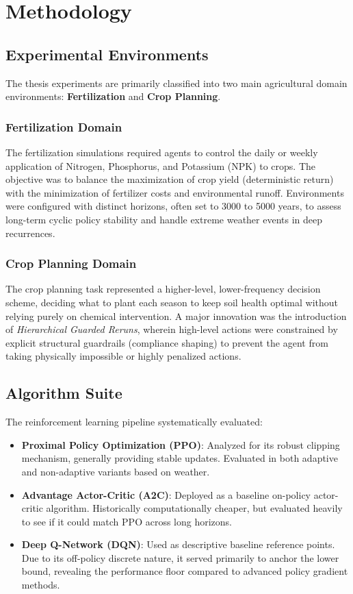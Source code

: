 \chapter{Methodology}
\label{chap:methods}

\section{Experimental Environments}

The thesis experiments are primarily classified into two main agricultural domain environments: \textbf{Fertilization} and \textbf{Crop Planning}. 

\subsection{Fertilization Domain}
The fertilization simulations required agents to control the daily or weekly application of Nitrogen, Phosphorus, and Potassium (NPK) to crops. The objective was to balance the maximization of crop yield (deterministic return) with the minimization of fertilizer costs and environmental runoff. Environments were configured with distinct horizons, often set to 3000 to 5000 years, to assess long-term cyclic policy stability and handle extreme weather events in deep recurrences.

\subsection{Crop Planning Domain}
The crop planning task represented a higher-level, lower-frequency decision scheme, deciding what to plant each season to keep soil health optimal without relying purely on chemical intervention. A major innovation was the introduction of \textit{Hierarchical Guarded Reruns}, wherein high-level actions were constrained by explicit structural guardrails (compliance shaping) to prevent the agent from taking physically impossible or highly penalized actions.

\section{Algorithm Suite}

The reinforcement learning pipeline systematically evaluated:
\begin{itemize}
    \item \textbf{Proximal Policy Optimization (PPO)}: Analyzed for its robust clipping mechanism, generally providing stable updates. Evaluated in both adaptive and non-adaptive variants based on weather.
    \item \textbf{Advantage Actor-Critic (A2C)}: Deployed as a baseline on-policy actor-critic algorithm. Historically computationally cheaper, but evaluated heavily to see if it could match PPO across long horizons.
    \item \textbf{Deep Q-Network (DQN)}: Used as descriptive baseline reference points. Due to its off-policy discrete nature, it served primarily to anchor the lower bound, revealing the performance floor compared to advanced policy gradient methods.
\end{itemize}

